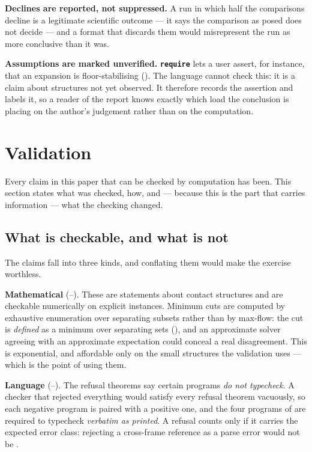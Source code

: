 \documentclass[11pt,twocolumn,a4paper]{article}
\theoremstyle{plain}
\theoremstyle{definition}
\theoremstyle{remark}
\newcommand{\kw}[1]{\texttt{\textbf{#1}}}
\begin{document}
\textbf{Declines are reported, not suppressed.} A run in which half the
comparisons decline is a legitimate scientific outcome --- it says the
comparison as posed does not decide --- and a format that discards them
would misrepresent the run as more conclusive than it was.

\textbf{Assumptions are marked unverified.} \kw{require} lets a user
assert, for instance, that an expansion is floor-stabilising
(). The language cannot check this: it is a claim
about structures not yet observed. It therefore records the assertion
and labels it, so a reader of the report knows exactly which load the
conclusion is placing on the author's judgement rather than on the
computation.

\section{Validation}
\label{sec:validation}

Every claim in this paper that can be checked by computation has been.
This section states what was checked, how, and --- because this is the
part that carries information --- what the checking changed.

\subsection{What is checkable, and what is not}

The claims fall into three kinds, and conflating them would make the
exercise worthless.

\textbf{Mathematical} (--). These
are statements about contact structures and are checkable numerically on
explicit instances. Minimum cuts are computed by exhaustive enumeration
over separating subsets rather than by max-flow: the cut is
\emph{defined} as a minimum over separating sets (),
and an approximate solver agreeing with an approximate expectation could
conceal a real disagreement. This is exponential, and affordable only on
the small structures the validation uses --- which is the point of using
them.

\textbf{Language} (--). The refusal
theorems say certain programs \emph{do not typecheck}. A checker that
rejected everything would satisfy every refusal theorem vacuously, so
each negative program is paired with a positive one, and the four
programs of  are required to typecheck
\emph{verbatim as printed}. A refusal counts only if it carries the
expected error class: rejecting a cross-frame reference as a parse error
would not be .
\end{document}
